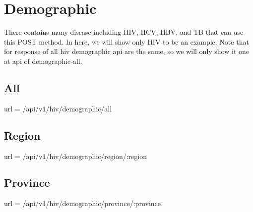         
    \newpage    
    \section{Demographic}
        There contains many disease including HIV, HCV, HBV, and TB that can use this POST method. In here, we will show only HIV to be an example. Note that for response of all hiv demographic api are the same, so we will only show it one at api of demographic-all.
        \subsection{All}
            url = /api/v1/hiv/demographic/all
            
        
        \newpage   
        \subsection{Region}
            url = /api/v1/hiv/demographic/region/:region
            
            
        \subsection{Province}
            url = /api/v1/hiv/demographic/province/:province
            
            
